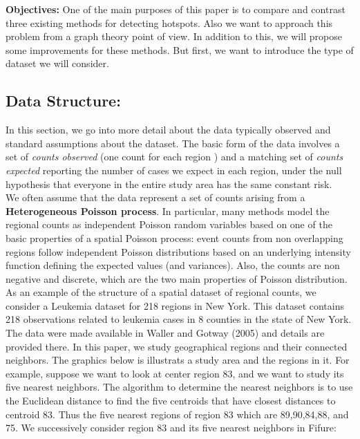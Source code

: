 \documentclass[12pt]{article}
\begin{document}
			\textbf{Objectives:} One of the main purposes of this paper is to compare and contrast three existing methods for detecting hotspots. Also we want to approach this problem from a graph theory point of view. In addition to this, we will propose some improvements for these methods. But first, we want to introduce the type of dataset we will consider. \\
				
		\subsection{Data Structure:} 
			In this section, we go into more detail about the data typically observed and standard assumptions about the dataset. 
			The basic form of the data involves a set of \textit{counts observed} (one count for each region ) and a matching set of \textit{counts expected} reporting the number of cases we expect in each region, under the null hypothesis that everyone in the entire study area has the same constant risk. \\
			
We often assume that the data represent a set of counts arising from a \textbf{Heterogeneous Poisson process}.
In particular, many methods model the regional counts as independent Poisson random variables based on one of the basic properties of a spatial Poisson process: event counts from non overlapping regions follow independent Poisson distributions based on an underlying intensity function defining the expected values (and variances). Also, the counts are non negative and discrete, which are the two main properties of Poisson distribution. \\
			 
			
			
			As an example of the structure of a spatial dataset of regional counts, we consider a Leukemia dataset for 218 regions in New York. This dataset contains 218 observations related to leukemia cases in 8 counties in the state of New York. The data were made available in Waller and Gotway (2005) and details are provided there. In this paper, we study geographical regions and their connected neighbors.		
The graphics below is illustrats a study area and the regions in it. For example, suppose we want to look at center region 83, and we want to study its five nearest neighbors. The algorithm to determine the nearest neighbors is to use the Euclidean distance to find the five centroids that have closest distances to centroid 83. Thus the five nearest regions of region 83 which are 89,90,84,88, and 75. We successively consider region 83 and its five nearest neighbors in Fifure: \\	
			
\end{document}
